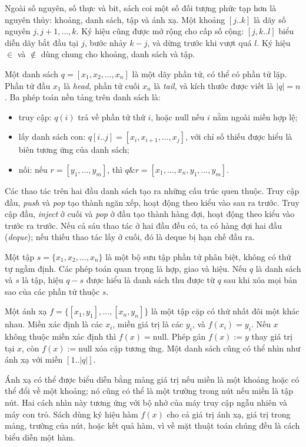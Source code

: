 \documentclass[11pt]{article}
\begin{document}
Ngoài số nguyên, số thực và bit, sách coi một số đối tượng phức tạp hơn là
nguyên thủy: khoảng, danh sách, tập và ánh xạ. Một khoảng \([j..k]\) là dãy
số nguyên \(j,j+1,\ldots,k\). Ký hiệu cũng được mở rộng cho cấp số cộng:
\([j,k..l]\) biểu diễn dãy bắt đầu tại \(j\), bước nhảy \(k-j\), và dừng trước
khi vượt quá \(l\). Ký hiệu \(\in\) và \(\notin\) dùng chung cho khoảng, danh
sách và tập.

Một danh sách \(q=[x_1,x_2,\ldots,x_n]\) là một dãy phần tử, có thể có phần tử
lặp. Phần tử đầu \(x_1\) là \emph{head}, phần tử cuối \(x_n\) là \emph{tail},
và kích thước được viết là \(|q|=n\). Ba phép toán nền tảng trên danh sách là:
\begin{itemize}
  \item truy cập: \(q(i)\) trả về phần tử thứ \(i\), hoặc \(\text{null}\) nếu
        \(i\) nằm ngoài miền hợp lệ;
  \item lấy danh sách con: \(q[i..j]=[x_i,x_{i+1},\ldots,x_j]\), với chỉ số
        thiếu được hiểu là biên tương ứng của danh sách;
  \item nối: nếu \(r=[y_1,\ldots,y_m]\), thì
        \(q \& r=[x_1,\ldots,x_n,y_1,\ldots,y_m]\).
\end{itemize}

Các thao tác trên hai đầu danh sách tạo ra những cấu trúc quen thuộc. Truy cập
đầu, \emph{push} và \emph{pop} tạo thành ngăn xếp, hoạt động theo kiểu vào sau
ra trước. Truy cập đầu, \emph{inject} ở cuối và \emph{pop} ở đầu tạo thành hàng
đợi, hoạt động theo kiểu vào trước ra trước. Nếu cả sáu thao tác ở hai đầu đều
có, ta có hàng đợi hai đầu (\emph{deque}); nếu thiếu thao tác lấy ở cuối, đó là
deque bị hạn chế đầu ra.

Một tập \(s=\{x_1,x_2,\ldots,x_n\}\) là một bộ sưu tập phần tử phân biệt,
không có thứ tự ngầm định. Các phép toán quan trọng là hợp, giao và hiệu. Nếu
\(q\) là danh sách và \(s\) là tập, hiệu \(q-s\) được hiểu là danh sách thu được
từ \(q\) sau khi xóa mọi bản sao của các phần tử thuộc \(s\).

Một ánh xạ \(f=\{[x_1,y_1],\ldots,[x_n,y_n]\}\) là một tập cặp có thứ nhất đôi
một khác nhau. Miền xác định là các \(x_i\), miền giá trị là các \(y_i\), và
\(f(x_i)=y_i\). Nếu \(x\) không thuộc miền xác định thì \(f(x)=\text{null}\).
Phép gán \(f(x):=y\) thay giá trị tại \(x\), còn \(f(x):=\text{null}\) xóa cặp
tương ứng. Một danh sách cũng có thể nhìn như ánh xạ với miền \([1..|q|]\).

Ánh xạ có thể được biểu diễn bằng mảng giá trị nếu miền là một khoảng hoặc có
thể đổi về một khoảng; nó cũng có thể là một trường trong nút nếu miền là tập
nút. Hai cách nhìn này tương ứng với bộ nhớ của máy truy cập ngẫu nhiên và máy
con trỏ. Sách dùng ký hiệu hàm \(f(x)\) cho cả giá trị ánh xạ, giá trị trong
mảng, trường của nút, hoặc kết quả hàm, vì về mặt thuật toán chúng đều là cách
biểu diễn một hàm.
\end{document}
